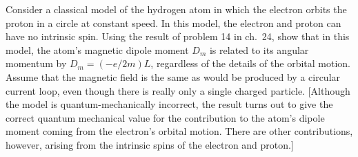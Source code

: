 Consider a classical model of the hydrogen atom in which
the electron orbits the proton in a circle at constant
speed. In this model, the electron and proton can have no
intrinsic spin. Using the result of problem 14 in ch.~24,
show that in this model, the atom's magnetic dipole
moment $D_m$ is related to its angular momentum by
$D_m=(-e/2m)L$, regardless of the details of the orbital
motion. Assume that the magnetic field is the same as would
be produced by a circular current loop, even though there is
really only a single charged particle. [Although the model
is quantum-mechanically incorrect, the result turns out to
give the correct quantum mechanical value for the contribution
to the atom's dipole moment coming from the electron's
orbital motion. There are other contributions, however,
arising from the intrinsic spins of the electron and proton.]

